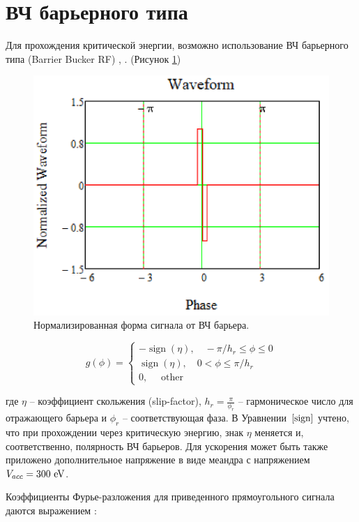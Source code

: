 \documentclass[a4paper]{panl}
\begin{document}
\section*{ВЧ барьерного типа}

\par Для прохождения критической энергии, возможно использование ВЧ барьерного типа (Barrier Bucker RF) \cite{bb}, \cite{malyshev}. (Рисунок \ref{fig:rf})

\begin{figure}[!h]
  \centering
   \includegraphics*[width=.75\columnwidth]{img/fig_04-1}
   \caption{Нормализированная форма сигнала от ВЧ барьера.}
   \label{fig:rf}
\end{figure}

\begin{equation}
g(\phi)=\left\{\begin{array}{c}
-\operatorname{sign}(\eta),\quad -\pi / h_r \leq \phi \leq 0 \\
\operatorname{sign}(\eta),\quad 0<\phi \leq \pi / h_r \\
0, \quad \text { other }
\end{array}\right.
\label{sign}
\end{equation}

где $\eta$ – коэффициент скольжения (slip-factor), $h_r=\frac{\pi}{\phi_{r}}$ – гармоническое число для отражающего барьера и $\phi_{r}$ – соответствующая фаза.  В У\-рав\-не\-нии~$\ref{sign}$ учтено, что при прохождении через критическую энергию, знак $\eta$ меняется и, соответственно, полярность ВЧ барьеров. Для ускорения может быть также приложено дополнительное напряжение в виде ме\-анд\-ра с нап\-ря\-же\-ни\-ем $V_{acc}=300~\rm{eV}$.

Коэффициенты Фурье-разложения для приведенного прямоугольного сигнала даются выражением \cite{bbcern}:
\end{document}
